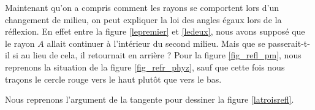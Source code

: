 Maintenant qu'on a compris comment les rayons se comportent lors d'un changement de milieu, on peut expliquer la loi des angles égaux lors de la réflexion. En effet entre la figure \ref{lepremier} et \ref{ledeux}, nous avons supposé que le rayon $A$ allait continuer à l'intérieur du second milieu. Mais que se passerait-t-il si au lieu de cela, il retournait en arrière ? Pour la figure \ref{fig_refl_pm}, nous reprenons la situation de la figure \ref{fig_refr_phyz}, sauf que cette fois nous traçons le cercle rouge vers le haut plutôt que vers le bas.

Nous reprenons l'argument de la tangente pour dessiner la figure \ref{latroisrefl}.

\newcommand{\prefigcalcrefl}{%
\pstGeonode(0,0){A}(2,0){B}			%
\pstHomO[HomCoef=-1]{A}{B}[B']			
\pstHomO[HomCoef=2]{A}{B}[A']
\pstRotation[RotAngle=-70]{A}{B'}[r1]		%
\pstTransHom{A}{r1}{B}{1}{r2}
\pstRotation[RotAngle=90]{A}{r1}[pl]
\pstInterLL{A}{pl}{B}{r2}{C}
\pstTransHom{C}{B}{A}{1}{Cl}			%
\pstInterLC{B'}{A'}{A}{Cl}{C1}{C2}
\pstTangenteOPM{A}{Cl}{B}{t2}{t1}
}


